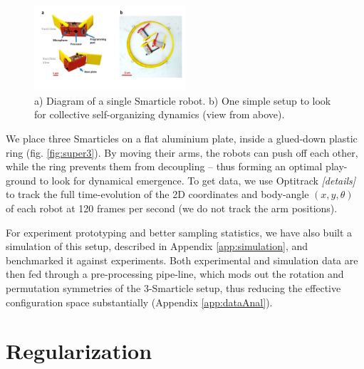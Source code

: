 \documentclass[reprint,prx]{revtex4-1}
\renewcommand{\=}[1]{\stackrel{#1}{=}} %
\renewcommand{\(}{\left (}
\renewcommand{\)}{\right  )}
\renewcommand{\[}{\left [}
\renewcommand{\]}{\right ]}
\newcommand{\<}{\left <}
\renewcommand{\>}{\right >}
\theoremstyle{definition}
\theoremstyle{remark}
\renewcommand{\todo}[1]{\textit{\color{red}[#1]}}
\begin{document}
\begin{figure} 
	\includegraphics[width=0.5\textwidth]{expt.pdf}
	\caption{a) Diagram of a single Smarticle robot. b) One simple setup to look for collective self-organizing dynamics (view from above).}
	\label{fig:smarticle}
\end{figure}

We place three Smarticles on a flat aluminium plate, inside a glued-down plastic ring (fig. \ref{fig:super3}). By moving their arms, the robots can push off each other, while the ring prevents them from decoupling -- thus forming an optimal play-ground to look for dynamical emergence. To get data, we use Optitrack \todo{details} to track the full time-evolution of the 2D coordinates and body-angle $ (x,y,\theta) $ of each robot at 120 frames per second (we do not track the arm positions). 

For experiment prototyping and better sampling statistics, we have also built a simulation of this setup, described in Appendix \ref{app:simulation}, and benchmarked it against experiments. Both experimental and simulation data are then fed through a pre-processing pipe-line, which mods out the rotation and permutation symmetries of the 3-Smarticle setup, thus reducing the effective configuration space substantially (Appendix \ref{app:dataAnal}).



\section{Regularization}
\end{document}
